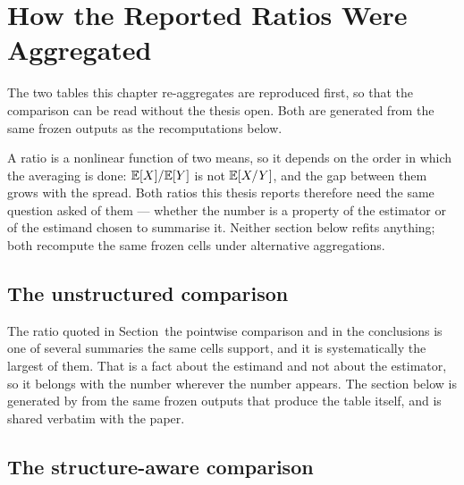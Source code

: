 %

\chapter{How the Reported Ratios Were Aggregated}\label{ch:aggregation}
\label{app:aggregation}

The two tables this chapter re-aggregates are reproduced first, so that the
comparison can be read without the thesis open. Both are generated from the
same frozen outputs as the recomputations below.








A ratio is a nonlinear function of two means, so it depends on the order in
which the averaging is done: $\mathbb{E}[X]/\mathbb{E}[Y]$ is not $\mathbb{E}[X/Y]$, and the gap
between them grows with the spread. Both ratios this thesis reports therefore
need the same question asked of them --- whether the number is a property of
the estimator or of the estimand chosen to summarise it. Neither section
below refits anything; both recompute the same frozen cells under alternative
aggregations.

\section{The unstructured comparison}

The ratio quoted in Section~the pointwise comparison and in the conclusions is one
of several summaries the same cells support, and it is systematically the
largest of them. That is a fact about the estimand and not about the
estimator, so it belongs with the number wherever the number appears. The
section below is generated by
 from the same frozen outputs
that produce the table itself, and is shared verbatim with the paper.



\section{The structure-aware comparison}

